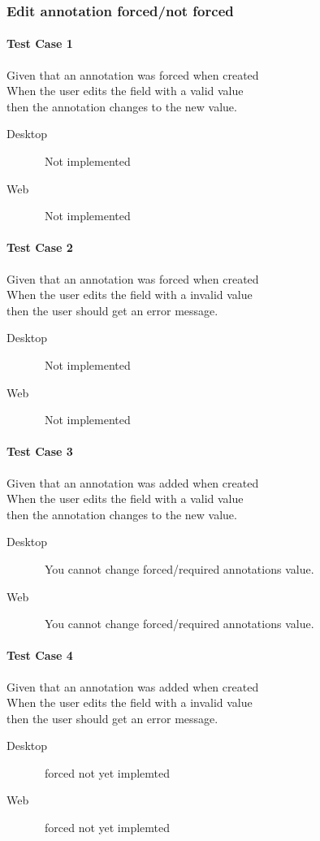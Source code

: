 \subsubsection{Edit annotation forced/not forced}
\paragraph*{Test Case 1}
Given that an annotation was forced when created \\ When the user edits the field with a valid value \\ then the annotation changes to the new value.
\begin{description}
 \item[Desktop] \xmark\ Not implemented
 \item[Web] \xmark\ Not implemented
\end{description}
\paragraph*{Test Case 2}
Given that an annotation was forced when created \\ When the user edits the field with a invalid value \\ then the user should get an error message.
\begin{description}
 \item[Desktop] \xmark\ Not implemented
 \item[Web] \xmark\ Not implemented
\end{description}
\paragraph*{Test Case 3}
Given that an annotation was added when created \\ When the user edits the field with a valid value \\ then the annotation changes to the new value.
\begin{description}
 \item[Desktop] \xmark\ You cannot change forced/required annotations value.
 \item[Web] \xmark\ You cannot change forced/required annotations value.
\end{description}
\paragraph*{Test Case 4}
Given that an annotation was added when created \\ When the user edits the field with a invalid value \\ then the user should get an error message.
\begin{description}
 \item[Desktop] \xmark\ forced not yet implemted
 \item[Web] \xmark\ forced not yet implemted
\end{description}


